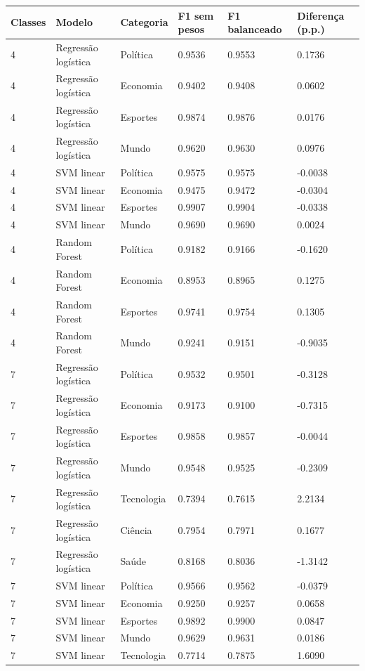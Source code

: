 \begin{tabular}{llllll}
\hline
Classes & Modelo & Categoria & F1 sem pesos & F1 balanceado & Diferença (p.p.) \\
\hline
4 & Regressão logística & Política & 0.9536 & 0.9553 & 0.1736 \\
4 & Regressão logística & Economia & 0.9402 & 0.9408 & 0.0602 \\
4 & Regressão logística & Esportes & 0.9874 & 0.9876 & 0.0176 \\
4 & Regressão logística & Mundo & 0.9620 & 0.9630 & 0.0976 \\
4 & SVM linear & Política & 0.9575 & 0.9575 & -0.0038 \\
4 & SVM linear & Economia & 0.9475 & 0.9472 & -0.0304 \\
4 & SVM linear & Esportes & 0.9907 & 0.9904 & -0.0338 \\
4 & SVM linear & Mundo & 0.9690 & 0.9690 & 0.0024 \\
4 & Random Forest & Política & 0.9182 & 0.9166 & -0.1620 \\
4 & Random Forest & Economia & 0.8953 & 0.8965 & 0.1275 \\
4 & Random Forest & Esportes & 0.9741 & 0.9754 & 0.1305 \\
4 & Random Forest & Mundo & 0.9241 & 0.9151 & -0.9035 \\
7 & Regressão logística & Política & 0.9532 & 0.9501 & -0.3128 \\
7 & Regressão logística & Economia & 0.9173 & 0.9100 & -0.7315 \\
7 & Regressão logística & Esportes & 0.9858 & 0.9857 & -0.0044 \\
7 & Regressão logística & Mundo & 0.9548 & 0.9525 & -0.2309 \\
7 & Regressão logística & Tecnologia & 0.7394 & 0.7615 & 2.2134 \\
7 & Regressão logística & Ciência & 0.7954 & 0.7971 & 0.1677 \\
7 & Regressão logística & Saúde & 0.8168 & 0.8036 & -1.3142 \\
7 & SVM linear & Política & 0.9566 & 0.9562 & -0.0379 \\
7 & SVM linear & Economia & 0.9250 & 0.9257 & 0.0658 \\
7 & SVM linear & Esportes & 0.9892 & 0.9900 & 0.0847 \\
7 & SVM linear & Mundo & 0.9629 & 0.9631 & 0.0186 \\
7 & SVM linear & Tecnologia & 0.7714 & 0.7875 & 1.6090 \\

\end{tabular}
